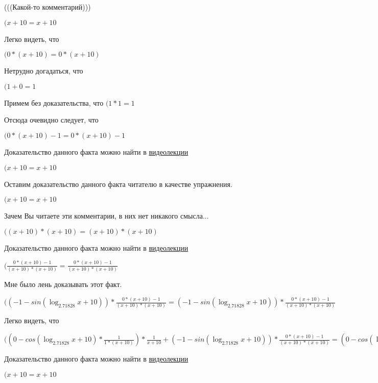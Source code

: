 \documentclass[12pt,a4paper,fleqn]{article}
\theoremstyle{definition}
\begin{document}
(((Какой-то комментарий)))

$( x  +  10  =  x  +  10 $

Легко видеть, что

$( 0  * ( x  +  10 ) =  0  * ( x  +  10 )$

Нетрудно догадаться, что

$( 1  +  0  =  1 $

Примем без доказательства, что
$( 1  *  1  =  1 $

Отсюда очевидно следует, что

$( 0  * ( x  +  10 ) -  1  =  0  * ( x  +  10 ) -  1 $

Доказательство данного факта можно найти в \href{https://www.youtube.com/watch?v=dQw4w9WgXcQ}{видеолекции}

$( x  +  10  =  x  +  10 $

Оставим доказательство данного факта читателю в качестве упражнения.

$( x  +  10  =  x  +  10 $

Зачем Вы читаете эти комментарии, в них нет никакого смысла...

$(( x  +  10 ) * ( x  +  10 ) = ( x  +  10 ) * ( x  +  10 )$

Доказательство данного факта можно найти в \href{https://www.youtube.com/watch?v=dQw4w9WgXcQ}{видеолекции}

$(\frac{ 0  * ( x  +  10 ) -  1 }{( x  +  10 ) * ( x  +  10 )}
 = \frac{ 0  * ( x  +  10 ) -  1 }{( x  +  10 ) * ( x  +  10 )}
$

Мне было лень доказывать этот факт.

$(( -1  - sin(\log_{ 2.71828 }{ x  +  10 })) * \frac{ 0  * ( x  +  10 ) -  1 }{( x  +  10 ) * ( x  +  10 )}
 = ( -1  - sin(\log_{ 2.71828 }{ x  +  10 })) * \frac{ 0  * ( x  +  10 ) -  1 }{( x  +  10 ) * ( x  +  10 )}
$

Легко видеть, что

$(( 0  - cos(\log_{ 2.71828 }{ x  +  10 }) * \frac{ 1 }{ 1  * ( x  +  10 )}
) * \frac{ 1 }{ x  +  10 }
 + ( -1  - sin(\log_{ 2.71828 }{ x  +  10 })) * \frac{ 0  * ( x  +  10 ) -  1 }{( x  +  10 ) * ( x  +  10 )}
 = ( 0  - cos(\log_{ 2.71828 }{ x  +  10 }) * \frac{ 1 }{ 1  * ( x  +  10 )}
) * \frac{ 1 }{ x  +  10 }
 + ( -1  - sin(\log_{ 2.71828 }{ x  +  10 })) * \frac{ 0  * ( x  +  10 ) -  1 }{( x  +  10 ) * ( x  +  10 )}
$

Доказательство данного факта можно найти в \href{https://www.youtube.com/watch?v=dQw4w9WgXcQ}{видеолекции}

$( x  +  10  =  x  +  10 $
\end{document}
